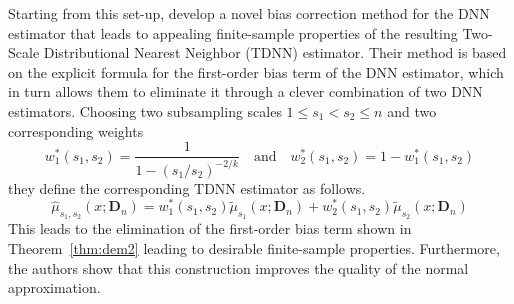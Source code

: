 Starting from this set-up, \citet{demirkaya_optimal_2024} develop a novel bias correction method for the DNN estimator that leads to appealing finite-sample properties of the resulting Two-Scale Distributional Nearest Neighbor (TDNN) estimator. 
Their method is based on the explicit formula for the first-order bias term of the DNN estimator, which in turn allows them to eliminate it through a clever combination of two DNN estimators. 
Choosing two subsampling scales $1 \leq s_1 < s_2 \leq n$ and two corresponding weights
\begin{equation}
	w_{1}^{*}(s_1, s_2) = \frac{1}{1-(s_1/s_2)^{-2/k}}
	\quad\text{and}\quad
	w_2^{*}(s_1, s_2) = 1 - w_{1}^{*}(s_1, s_2)
\end{equation}
they define the corresponding TDNN estimator as follows.
\begin{equation}
	\hat{\mu}_{s_1, s_2}\left(x; \mathbf{D}_n\right)
	= w_{1}^{*}(s_1, s_2)\tilde{\mu}_{s_1}\left(x; \mathbf{D}_n\right) + w_2^{*}(s_1, s_2)\tilde{\mu}_{s_2}\left(x; \mathbf{D}_n\right)
\end{equation}
This leads to the elimination of the first-order bias term shown in Theorem~\ref{thm:dem2} leading to desirable finite-sample properties.
Furthermore, the authors show that this construction improves the quality of the normal approximation.

